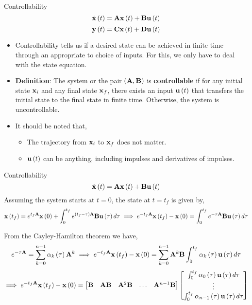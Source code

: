 \documentclass[aspectratio=169]{beamer}
\def\mf{\ensuremath\mathbf}
\def\lp{\ensuremath\left(}
\def\rp{\ensuremath\right)}
\def\bmx{\ensuremath\begin{bmatrix*}[r]}
\def\emx{\ensuremath\end{bmatrix*}}
\def\bmxc{\ensuremath\begin{bmatrix*}[c]}
\newcommand{\ct}[1]{\lp #1\rp}
\begin{document}
\begin{frame}[t]{Controllability}
\[ \dot{\mf{x}}\ct{t} = \mf{A}\mf{x}\ct{t} + \mf{B}\mf{u}\ct{t} \]
\[ \mf{y}\ct{t} = \mf{C}\mf{x}\ct{t} + \mf{D}\mf{u}\ct{t} \]
\vspace{-0.5cm}
\begin{itemize}
    \item Controllability tells us if a desired state can be achieved in finite time through an appropriate to choice of inputs. For this, we only have to deal with the state equation.
    
    \item \textbf{Definition}: The system or the pair $\ct{\mf{A}, \mf{B}}$ is \textbf{controllable} if for any initial state $\mf{x}_i$ and any final state $\mf{x}_f$, there exists an input $\mf{u}\ct{t}$ that transfers the initial state to the final state in finite time. Otherwise, the system is uncontrollable.

    \item It should be noted that,
    \begin{itemize}
         \item The trajectory from $\mf{x}_i$ to $\mf{x}_f$ does not matter.
         \item $\mf{u}\ct{t}$ can be anything, including impulses and derivatives of impulses.
     \end{itemize}
\end{itemize}
\end{frame}


\begin{frame}{Controllability}
\[ \dot{\mf{x}}\ct{t} = \mf{A}\mf{x}\ct{t} + \mf{B}\mf{u}\ct{t} \]
Assuming the system starts at $t=0$, the state at $t = t_f$ is given by,\vspace{-0.15cm}
\[ \mf{x}\ct{t_f} = e^{t_f\mf{A}}\mf{x}\ct{0} + \int_{0}^{t_f} e^{\ct{t_f - \tau}\mf{A}}\mf{B}\mf{u}\ct{\tau}d\tau \implies e^{-t_f\mf{A}}\mf{x}\ct{t_f} - \mf{x}\ct{0} =  \int_{0}^{t_f} e^{-\tau\mf{A}}\mf{B}\mf{u}\ct{\tau}d\tau \]

From the Cayley-Hamilton theorem we have,
\[ e^{-\tau\mf{A}} = \sum_{k=0}^{n-1}\alpha_k\ct{\tau}\mf{A}^k \implies e^{-t_f\mf{A}}\mf{x}\ct{t_f} - \mf{x}\ct{0} =  \sum_{k=0}^{n-1} \mf{A}^k\mf{B}\int_{0}^{t_f} \alpha_k\ct{\tau}\mf{u}\ct{\tau}d\tau \] \vspace{-0.15cm}
\[ \implies e^{-t_f\mf{A}}\mf{x}\ct{t_f} - \mf{x}\ct{0} =  \bmx \mf{B} & \mf{A}\mf{B} & \mf{A}^2\mf{B} & \ldots & \mf{A}^{n-1}\mf{B} \emx \bmxc \int_{0}^{t_f} \alpha_0\ct{\tau}\mf{u}\ct{\tau}d\tau \\ \vdots \\ \int_{0}^{t_f} \alpha_{n-1}\ct{\tau}\mf{u}\ct{\tau}d\tau \emx \]
\end{frame}
\end{document}
